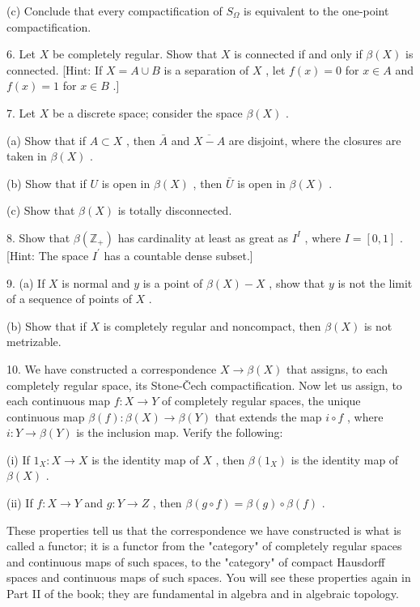 (c) Conclude that every compactification of \({S}_{\Omega }\) is equivalent to the one-point compactification.

6. Let \(X\) be completely regular. Show that \(X\) is connected if and only if \(\beta \left( X\right)\) is connected. [Hint: If \(X = A \cup  B\) is a separation of \(X\) , let \(f\left( x\right)  = 0\) for \(x \in  A\) and \(f\left( x\right)  = 1\) for \(x \in  B\) .]

7. Let \(X\) be a discrete space; consider the space \(\beta \left( X\right)\) .

(a) Show that if \(A \subset  X\) , then \(\bar{A}\) and \(\overline{X - A}\) are disjoint, where the closures are taken in \(\beta \left( X\right)\) .

(b) Show that if \(U\) is open in \(\beta \left( X\right)\) , then \(\bar{U}\) is open in \(\beta \left( X\right)\) .

(c) Show that \(\beta \left( X\right)\) is totally disconnected.

8. Show that \(\beta \left( {\mathbb{Z}}_{ + }\right)\) has cardinality at least as great as \({I}^{I}\) , where \(I = \left\lbrack  {0,1}\right\rbrack\) . [Hint: The space \({I}^{\prime }\) has a countable dense subset.]

9. (a) If \(X\) is normal and \(y\) is a point of \(\beta \left( X\right)  - X\) , show that \(y\) is not the limit of a sequence of points of \(X\) .

(b) Show that if \(X\) is completely regular and noncompact, then \(\beta \left( X\right)\) is not metrizable.

10. We have constructed a correspondence \(X \rightarrow  \beta \left( X\right)\) that assigns, to each completely regular space, its Stone-Čech compactification. Now let us assign, to each continuous map \(f : X \rightarrow  Y\) of completely regular spaces, the unique continuous map \(\beta \left( f\right)  : \beta \left( X\right)  \rightarrow  \beta \left( Y\right)\) that extends the map \(i \circ  f\) , where \(i : Y \rightarrow  \beta \left( Y\right)\) is the inclusion map. Verify the following:

(i) If \({1}_{X} : X \rightarrow  X\) is the identity map of \(X\) , then \(\beta \left( {1}_{X}\right)\) is the identity map of \(\beta \left( X\right)\) .

(ii) If \(f : X \rightarrow  Y\) and \(g : Y \rightarrow  Z\) , then \(\beta \left( {g \circ  f}\right)  = \beta \left( g\right)  \circ  \beta \left( f\right)\) .

These properties tell us that the correspondence we have constructed is what is called a functor; it is a functor from the "category" of completely regular spaces and continuous maps of such spaces, to the "category" of compact Hausdorff spaces and continuous maps of such spaces. You will see these properties again in Part II of the book; they are fundamental in algebra and in algebraic topology.